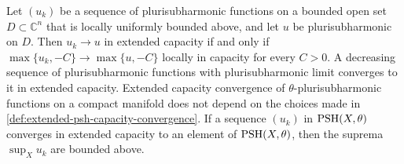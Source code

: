 \begin{lemma}\label{lem:extended-capacity-truncations}
Let $(u_k)$ be a sequence of plurisubharmonic functions on a bounded open set $D\subset\mathbb C^n$ that is locally uniformly bounded above, and let $u$ be plurisubharmonic on $D$. Then $u_k\to u$ in extended capacity if and only if $\max\{u_k,-C\}\to\max\{u,-C\}$ locally in capacity for every $C>0$. A decreasing sequence of plurisubharmonic functions with plurisubharmonic limit converges to it in extended capacity. Extended capacity convergence of $\theta$-plurisubharmonic functions on a compact manifold does not depend on the choices made in \cref{def:extended-psh-capacity-convergence}. If a sequence $(u_k)$ in $\mathrm{PSH}(X,\theta)$ converges in extended capacity to an element of $\mathrm{PSH}(X,\theta)$, then the suprema $\sup_Xu_k$ are bounded above.
\end{lemma}
